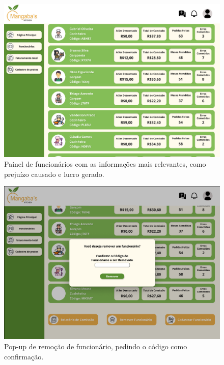 \begin{center}
\begin{figure}[!htp]
    \end{figure}
    \newpage
    \begin{figure}[!htp]
        \includegraphics[width=1\textwidth]{imagens-template/Layout_Gerente_2659.png} 
        \caption{Painel de funcionários com as informações mais relevantes, como prejuízo causado e lucro gerado.}
    \end{figure}
    \newpage
    \begin{figure}[!htp]
        \includegraphics[width=1\textwidth]{imagens-template/Layout_Gerente_2657.png} 
        \caption{Pop-up de remoção de funcionário, pedindo o código como confirmação.}
    \end{figure}
    \newpage
    \begin{figure}[!htp]

\end{figure}
\end{center}

